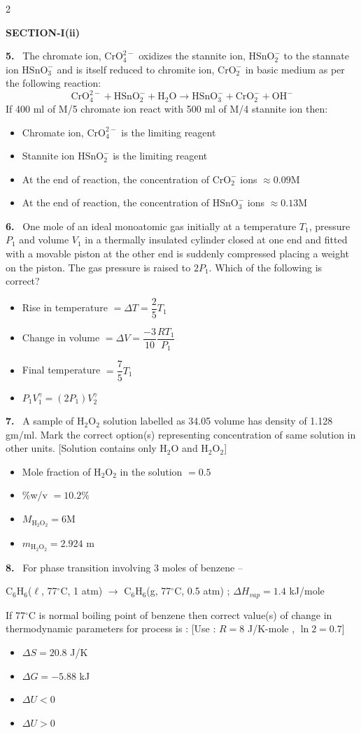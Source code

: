 \documentclass[10pt]{extarticle}
\newcommand{\sect}[1]{\par\smallskip\noindent\textbf{#1}\par}
\newcommand{\qn}[1]{\par\smallskip\noindent\textbf{#1.}~}
\newenvironment{qoptions}{\begin{itemize}[leftmargin=1.8em,itemsep=1pt,topsep=2pt,label={}]}{\end{itemize}}
\newcommand{\opt}[2]{\item[(#1)] #2}
\begin{document}
\begin{multicols}{2}
\sect{SECTION-I(ii)}
\qn{5} The chromate ion, $\mathrm{CrO_4^{2-}}$ oxidizes the stannite ion, $\mathrm{HSnO_2^-}$ to the stannate ion $\mathrm{HSnO_3^-}$ and is itself reduced to chromite ion, $\mathrm{CrO_2^-}$ in basic medium as per the following reaction:
\[\mathrm{CrO_4^{2-}+HSnO_2^-+H_2O\to HSnO_3^-+CrO_2^-+OH^-}\]
If 400 ml of M/5 chromate ion react with 500 ml of M/4 stannite ion then:
\begin{qoptions}
\opt{A}{Chromate ion, $\mathrm{CrO_4^{2-}}$ is the limiting reagent}
\opt{B}{Stannite ion $\mathrm{HSnO_2^-}$ is the limiting reagent}
\opt{C}{At the end of reaction, the concentration of $\mathrm{CrO_2^-}$ ions $\approx0.09$M}
\opt{D}{At the end of reaction, the concentration of $\mathrm{HSnO_3^-}$ ions $\approx0.13$M}
\end{qoptions}

\qn{6} One mole of an ideal monoatomic gas initially at a temperature $T_1$, pressure $P_1$ and volume $V_1$ in a thermally insulated cylinder closed at one end and fitted with a movable piston at the other end is suddenly compressed placing a weight on the piston. The gas pressure is raised to $2P_1$. Which of the following is correct?
\begin{qoptions}
\opt{A}{Rise in temperature $=\Delta T=\dfrac{2}{5}T_1$}
\opt{B}{Change in volume $=\Delta V=\dfrac{-3}{10}\dfrac{RT_1}{P_1}$}
\opt{C}{Final temperature $=\dfrac{7}{5}T_1$}
\opt{D}{$P_1V_1^{\gamma}=(2P_1)V_2^{\gamma}$}
\end{qoptions}

\qn{7} A sample of H$_2$O$_2$ solution labelled as 34.05 volume has density of 1.128 gm/ml. Mark the correct option(s) representing concentration of same solution in other units. [Solution contains only H$_2$O and H$_2$O$_2$]
\begin{qoptions}
\opt{A}{Mole fraction of H$_2$O$_2$ in the solution $=0.5$}
\opt{B}{\%w/v $=10.2\%$}
\opt{C}{$M_{\mathrm{H_2O_2}}=6$M}
\opt{D}{$m_{\mathrm{H_2O_2}}=2.924$ m}
\end{qoptions}

\qn{8} For phase transition involving 3 moles of benzene --

C$_6$H$_6$($\ell$, 77$^\circ$C, 1 atm) $\to$ C$_6$H$_6$(g, 77$^\circ$C, 0.5 atm) ; $\Delta H_{vap}=1.4$ kJ/mole

If 77$^\circ$C is normal boiling point of benzene then correct value(s) of change in thermodynamic parameters for process is : [Use : $R=8$ J/K-mole , $\ln2=0.7$]
\begin{qoptions}
\opt{A}{$\Delta S=20.8$ J/K}
\opt{B}{$\Delta G=-5.88$ kJ}
\opt{C}{$\Delta U<0$}
\opt{D}{$\Delta U>0$}
\end{qoptions}


\end{multicols}
\end{document}
